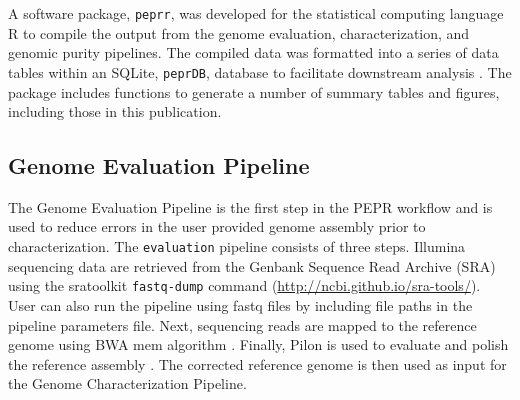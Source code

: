 \documentclass[smallextended]{svjour3}\usepackage[]{graphicx}\usepackage[]{color}
\begin{document}
A software package, \texttt{peprr}, was developed for the statistical computing language R \cite{R2015} to compile the output from the genome evaluation, characterization, and genomic purity pipelines. 
The compiled data was formatted into a series of data tables within an SQLite, \texttt{peprDB}, database to facilitate downstream analysis \cite{wickham2014tidy}. 
The package includes functions to generate a number of summary tables and figures, including those in this publication.


\subsection{Genome Evaluation Pipeline}
\label{method:2}
The Genome Evaluation Pipeline is the first step in the PEPR workflow and is used to reduce errors in the user provided genome assembly prior to characterization. 
The \texttt{evaluation} pipeline consists of three steps. 
Illumina sequencing data are retrieved from the Genbank Sequence Read Archive (SRA) using the sratoolkit \texttt{fastq-dump} command (\url{http://ncbi.github.io/sra-tools/}). 
User can also run the pipeline using fastq files by including file paths in the pipeline parameters file. 
Next, sequencing reads are mapped to the reference genome using BWA mem algorithm \cite{Li2013c}. 
Finally, Pilon is used to evaluate and polish the reference assembly \cite{Walker2014}. 
The corrected reference genome is then used as input for the Genome Characterization Pipeline.
\end{document}
